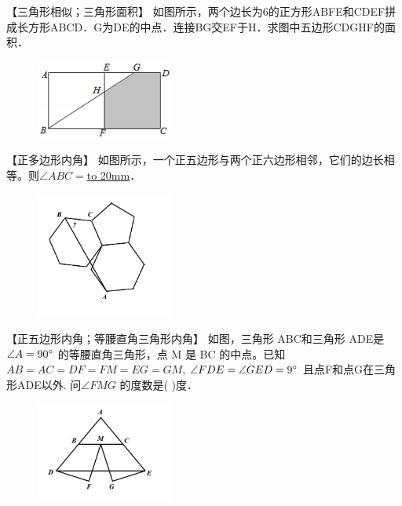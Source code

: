 \item {
    【三角形相似；三角形面积】
    {如图所示，两个边长为6的正方形ABFE和CDEF拼成长方形ABCD．G为DE的中点．连接BG交EF于H．求图中五边形CDGHF的面积．} 
    \begin{figure}[H] 
        \centering
        \includegraphics[width=0.4\textwidth]{./pics/Chapter_3/13.png}
    \end{figure}
    \vspace{1cm}
}
\item {
    【正多边形内角】
    {如图所示，一个正五边形与两个正六边形相邻，它们的边长相等。则$\angle ABC = $\underline{\hbox to 20mm{}}．} 
    \begin{figure}[H] 
        \centering
        \includegraphics[width=0.4\textwidth]{./pics/Chapter_3/7.png}
    \end{figure}
    \vspace{1cm}
}

\item {
    【正五边形内角；等腰直角三角形内角】
    {如图，三角形 ABC和三角形 ADE是 $\angle A=90\degree$ 的等腰直角三角形，点 M 是 BC 的中点。已知$AB=AC=DF=FM=EG=GM$, $\angle FDE = \angle GED=9\degree$ 且点F和点G在三角形ADE以外. 问$\angle FMG$ 的度数是( )度．} 
    \begin{figure}[H] 
        \centering
        \includegraphics[width=0.4\textwidth]{./pics/Chapter_3/8.png}
    \end{figure}
    \vspace{1cm}
}

